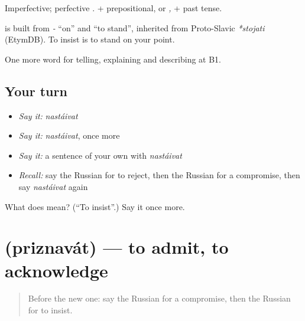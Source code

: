 Imperfective; perfective \emph{}. \emph{ } + prepositional, or \emph{, } + past tense.

\begin{cousinweb}
\textbf{} is built from \emph{-} \textquotedblleft{}on\textquotedblright{} and \emph{} \textquotedblleft{}to stand\textquotedblright{}, inherited from Proto-Slavic \emph{*stojati} (EtymDB). To insist is to stand on your point.
\end{cousinweb}

\begin{grammarlens}[title={What you've built}]
One more word for telling, explaining and describing at B1.
\end{grammarlens}

\subsection*{Your turn}
\begin{itemize}
\raggedright
  \item \emph{Say it:} \emph{nastáivat}
  \item \emph{Say it:} \emph{nastáivat}, once more
  \item \emph{Say it:} a sentence of your own with \emph{nastáivat}
  \item \emph{Recall:} say the Russian for to reject, then the Russian for a compromise, then say \emph{nastáivat} again
\end{itemize}

\begin{tcolorbox}[breakable,colback=teal!4,colframe=teal!35!black,title={Before you move on}]
What does  mean? (\textquotedblleft{}To insist\textquotedblright{}.) Say it once more.
\end{tcolorbox}
\section[\texorpdfstring{\ru{признавать} (priznavát)}{признавать (priznavát)}]{ (priznavát) — to admit, to acknowledge}

\label{lesson:RU-C341-priznavat}



\begin{quote}
Before the new one: say the Russian for a compromise, then the Russian for to insist.
\end{quote}

